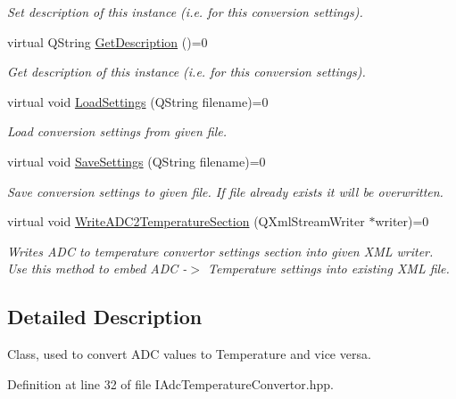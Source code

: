 \begin{DoxyCompactItemize}
\begin{DoxyCompactList}\small\item\em Set description of this instance (i.\+e. for this conversion settings). \end{DoxyCompactList}\item 
virtual Q\+String \hyperlink{class_interfaces_1_1_i_adc_temperature_convertor_a2f3b59be793c3ed43e880ef12e9749bc}{Get\+Description} ()=0
\begin{DoxyCompactList}\small\item\em Get description of this instance (i.\+e. for this conversion settings). \end{DoxyCompactList}\item 
virtual void \hyperlink{class_interfaces_1_1_i_adc_temperature_convertor_a9697a0319f82ebd1fc20f5e24d3b191c}{Load\+Settings} (Q\+String filename)=0
\begin{DoxyCompactList}\small\item\em Load conversion settings from given file. \end{DoxyCompactList}\item 
virtual void \hyperlink{class_interfaces_1_1_i_adc_temperature_convertor_a6631e979e067ab78d3e5c337449876ac}{Save\+Settings} (Q\+String filename)=0
\begin{DoxyCompactList}\small\item\em Save conversion settings to given file. If file already exists it will be overwritten. \end{DoxyCompactList}\item 
virtual void \hyperlink{class_interfaces_1_1_i_adc_temperature_convertor_abc7ed5fdfeaed255af14930431b46ac1}{Write\+A\+D\+C2\+Temperature\+Section} (Q\+Xml\+Stream\+Writer $\ast$writer)=0
\begin{DoxyCompactList}\small\item\em Writes A\+DC to temperature convertor settings section into given X\+ML writer. Use this method to embed A\+DC -\/$>$ Temperature settings into existing X\+ML file. \end{DoxyCompactList}\end{DoxyCompactItemize}


\subsection{Detailed Description}
Class, used to convert A\+DC values to Temperature and vice versa. 

Definition at line 32 of file I\+Adc\+Temperature\+Convertor.\+hpp.



